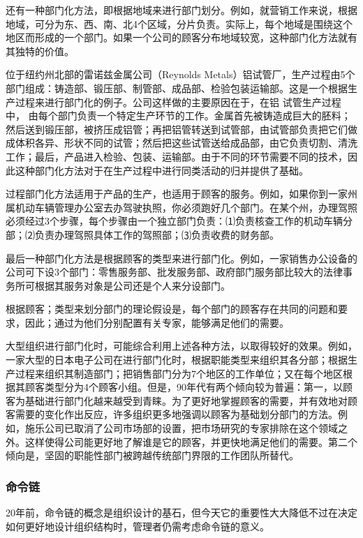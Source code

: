     还有一种部门化方法，即根据地域来进行部门划分。例如，就营销工作来说，根据地域，可分为东、西、南、北4个区域，分片负责。实际上，每个地域是围绕这个地区而形成的一个部门。如果一个公司的顾客分布地域较宽，这种部门化方法就有其独特的价值。

    位于纽约州北部的雷诺兹金属公司（Reynolds Metals）铝试管厂，生产过程由5个部门组成：铸造部、锻压部、制管部、成品部、检验包装运输部。这是一个根据生产过程来进行部门化的例子。公司这样做的主要原因在于，在铝 试管生产过程中， 由每个部门负责一个特定生产环节的工作。金属首先被铸造成巨大的胚料；然后送到锻压部，被挤压成铝管；再把铝管转送到试管部，由试管部负责把它们做成体积各异、形状不同的试管；然后把这些试管送给成品部，由它负责切割、清洗工作；最后，产品进入检验、包装、运输部。由于不同的环节需要不同的技术，因此这种部门化方法对于在生产过程中进行同类活动的归并提供了基础。

    过程部门化方法适用于产品的生产，也适用于顾客的服务。例如，如果你到一家州属机动车辆管理办公室去办驾驶执照，你必须跑好几个部门。在某个州，办理驾照必须经过3个步骤，每个步骤由一个独立部门负责：⑴负责核查工作的机动车辆分部；⑵负责办理驾照具体工作的驾照部；⑶负责收费的财务部。

    最后一种部门化方法是根据顾客的类型来进行部门化。例如，一家销售办公设备的公司可下设3个部门：零售服务部、批发服务部、政府部门服务部比较大的法律事务所可根据其服务对象是公司还是个人来分设部门。

    根据顾客；类型来划分部门的理论假设是，每个部门的顾客存在共同的问题和要求，因此；通过为他们分别配置有关专家，能够满足他们的需要。

    大型组织进行部门化时，可能综合利用上述各种方法，以取得较好的效果。例如，一家大型的日本电子公司在进行部门化时，根据职能类型来组织其各分部；根据生产过程来组织其制造部门；把销售部门分为7个地区的工作单位；又在每个地区根据其顾客类型分为4个顾客小组。但是，90年代有两个倾向较为普遍：第一，以顾客为基础进行部门化越来越受到青睐。为了更好地掌握顾客的需要，并有效地对顾客需要的变化作出反应，许多组织更多地强调以顾客为基础划分部门的方法。例如，施乐公司已取消了公司市场部的设置，把市场研究的专家排除在这个领域之外。这样使得公司能更好地了解谁是它的顾客，并更快地满足他们的需要。第二个倾向是，坚固的职能性部门被跨越传统部门界限的工作团队所替代。

    \subsubsection {命令链}

    20年前，命令链的概念是组织设计的基石，但今天它的重要性大大降低不过在决定如何更好地设计组织结构时，管理者仍需考虑命令链的意义。

